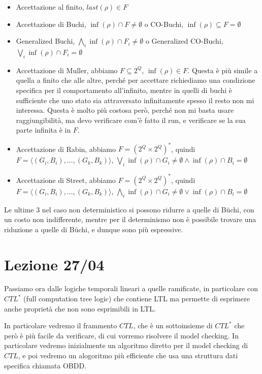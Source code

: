 \begin{itemize}
  \item Accettazione al finito, \(last(\rho) \in F\)
  \item Accettazione di Buchi, \(\inf(\rho) \cap F \neq \emptyset\) o CO-Buchi, \(\inf(\rho) \subseteq F = \emptyset\)
  \item Generalized Buchi, \(\bigwedge_i \inf(\rho) \cap F_i \neq \emptyset\) o Generalized CO-Buchi, \(\bigvee_i \inf(\rho) \cap F_i = \emptyset\)
  \item Accettazione di Muller, abbiamo \(F\subseteq 2^Q\), \(\inf(\rho) \in F\). Questa è più simile a quella a finito che alle altre, perché per accettare richiediamo una condizione specifica per il comportamento all'infinito, mentre in quelli di buchi è sufficiente che uno stato sia attraversato infinitamente spesso il resto non mi interessa. Questa è molto più costosa però, perché non mi basta usare raggiungibilità, ma devo verificare com'è fatto il run, e verificare se la sua parte infinita è in \(F\).
  \item Accettazione di Rabin, abbiamo \(F = {(2^Q\times 2^Q)}^*\), quindi \(F = \langle (G_i,B_i),\ldots,(G_k, B_k)\rangle\), \(\bigvee_i \inf(\rho) \cap G_i \neq \emptyset \land \inf(\rho) \cap B_i = \emptyset\)
  \item Accettazione di Street, abbiamo \(F = {(2^Q\times 2^Q)}^*\), quindi \(F = \langle (G_i,B_i),\ldots,(G_k, B_k)\rangle\), \(\bigwedge_i \inf(\rho) \cap G_i \neq \emptyset \lor \inf(\rho) \cap B_i = \emptyset\)
\end{itemize}

Le ultime 3 nel caso non deterministico si possono ridurre a quelle di Büchi, con un costo non indifferente, mentre per il determinismo non è possibile trovare una riduzione a quelle di Büchi, e dunque sono più espressive.

\chapter{Lezione 27/04}

Passiamo ora dalle logiche temporali lineari a quelle ramificate, in particolare con \(CTL^*\) (full computation tree logic) che contiene LTL ma permette di esprimere anche proprietà che non sono esprimibili in LTL\@.

In particolare vedremo il frammento \(CTL\), che è un sottoinsieme di \(CTL^*\) che però è più facile da verificare, di cui vorremo risolvere il model checking. In particolare vedremo inizialmente un algoritmo diretto per il model checking di \(CTL\), e poi vedremo un alogoritmo più efficiente che usa una struttura dati specifica chiamata OBDD\@.

